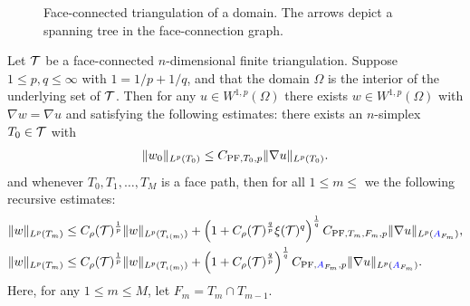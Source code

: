 \documentclass[10pt,letterpaper]{article}
\begin{document}
\begin{figure}[t]
\begin{center}
\begin{tikzpicture}[rotate=-60]
\end{tikzpicture}
\end{center}
\caption{Face-connected triangulation of a domain. The arrows depict a spanning tree in the face-connection graph.}
\label{figure:spanningtree}
\end{figure}


\begin{theorem}\label{theorem:poincarefriedrichsestimate:grad}
    Let $\calT$ be a face-connected $n$-dimensional finite triangulation. 
    Suppose $1 \leq p,q \leq \infty$ with $1 = 1/p + 1/q$,
    and that the domain $\Omega$ is the interior of the underlying set of $\calT$. 
    Then for any $u \in W^{1,p}(\Omega)$ 
    there exists $w \in W^{1,p}(\Omega)$ with $\nabla w = \nabla u$ 
    and satisfying the following estimates:
    there exists an $n$-simplex $T_0 \in \calT$ with 
    \begin{gather*}
        \| w_0 \|_{L^{p}(T_{0})} \leq C_{{\rm{PF}},T_{0},p} \| \nabla u \|_{L^{p}(T_{0})}.
    \end{gather*}
    and whenever $T_0, T_1, \dots, T_M$ is a face path,
    then for all $1 \leq m \leq$ we the following recursive estimates:
    \begin{align*}
        \| w \|_{L^{p}(T_{m})}
        &
        \leq  
        \volumeratio(\calT)^{\frac 1 p} 
        \| w \|_{L^{p}(T_{\iota(m)})} 
        + 
        \left( 1 + \volumeratio(\calT)^{\frac q p} \xi(\calT)^{q} \right)^{\frac 1 q}
        C_{\PF,T_{m},F_{m},p} 
        \| \nabla u \|_{L^{p}(\Minako_{F_m})} 
        ,
        \\
        \| w \|_{L^{p}(T_m)}
        &\leq 
        \volumeratio(\calT)^{\frac 1 p} 
        \| w \|_{L^{p}(T_{{\iota(m)}})}
        +
        \left( 1 + \volumeratio(\calT)^{\frac q p} \right)^{\frac 1 q}
        C_{{\rm{PF}},\Minako_{F_m},p} 
        \| \nabla u \|_{L^{p}(\Minako_{F_m})} 
        . 
    \end{align*}
    Here, for any $1 \leq m \leq M$, let $F_m = T_m \cap T_{m-1}$.
\end{theorem}
\end{document}
